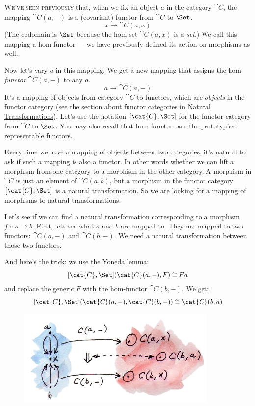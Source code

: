 
\lettrine[lhang=0.17]{W}{e've seen previously} that, when we fix an object $a$ in the
category $\cat{C}$, the mapping $\cat{C}(a, -)$ is a (covariant)
functor from $\cat{C}$ to $\Set$.
\[x \to \cat{C}(a, x)\]
(The codomain is $\Set$ because the hom-set $\cat{C}(a, x)$ is a
\emph{set}.) We call this mapping a hom-functor --- we have previously
defined its action on morphisms as well.

Now let's vary $a$ in this mapping. We get a new mapping that
assigns the hom-\emph{functor} $\cat{C}(a, -)$ to any $a$.
\[a \to \cat{C}(a, -)\]
It's a mapping of objects from category $\cat{C}$ to functors, which are
\emph{objects} in the functor category (see the section about functor
categories in
\hyperref[natural-transformations]{Natural
Transformations}). Let's use the notation $[\cat{C}, \Set]$ for the
functor category from $\cat{C}$ to $\Set$. You may also recall that
hom-functors are the prototypical
\hyperref[representable-functors]{representable
functors}.

Every time we have a mapping of objects between two categories, it's
natural to ask if such a mapping is also a functor. In other words
whether we can lift a morphism from one category to a morphism in the
other category. A morphism in $\cat{C}$ is just an element of
$\cat{C}(a, b)$, but a morphism in the functor category
$[\cat{C}, \Set]$ is a natural transformation. So we are looking
for a mapping of morphisms to natural transformations.

Let's see if we can find a natural transformation corresponding to a
morphism $f \Colon a \to b$. First, lets see what
$a$ and $b$ are mapped to. They are mapped to two
functors: $\cat{C}(a, -)$ and $\cat{C}(b, -)$. We need a natural
transformation between those two functors.

And here's the trick: we use the Yoneda lemma:
\[[\cat{C}, \Set](\cat{C}(a, -), F) \cong F a\]
and replace the generic $F$ with the hom-functor
$\cat{C}(b, -)$. We get:
\[[\cat{C}, \Set](\cat{C}(a, -), \cat{C}(b, -)) \cong \cat{C}(b, a)\]
\begin{figure}[H]
\centering
\includegraphics[width=3.87500in]{images/yoneda-embedding.jpg}
\end{figure}

